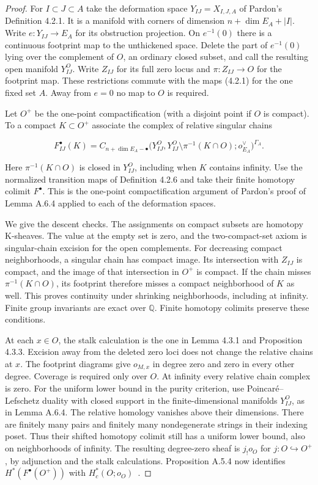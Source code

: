 \begin{proof}
For $I\subset J\subset A$ take the deformation
space $Y_{IJ}=X_{I,J,A}$ of Pardon's Definition 4.2.1. It is a
manifold with corners of dimension $n+\dim E_A+|I|$. Write
$e:Y_{IJ}\to E_A$ for its obstruction projection. On $e^{-1}(0)$
there is a continuous footprint map to the unthickened space.
Delete the part of $e^{-1}(0)$ lying over the complement of $O$,
an ordinary closed subset, and call the resulting open manifold
$Y^O_{IJ}$. Write $Z_{IJ}$ for its full zero locus and
$\pi:Z_{IJ}\to O$ for the footprint map. These restrictions commute
with the maps (4.2.1) for the one fixed set $A$. Away from $e=0$
no map to $O$ is required.

Let $O^+$ be the one-point compactification (with a disjoint point
if $O$ is compact). To a compact $K\subset O^+$ associate the
complex of relative singular chains

\[
 F_{IJ}^\bullet(K)=
 C_{n+\dim E_A-\bullet}
 \big(Y^O_{IJ},Y^O_{IJ}\setminus\pi^{-1}(K\cap O);
                     o_{E_A}^{\vee}\big)^{\Gamma_A}.
\]

Here $\pi^{-1}(K\cap O)$ is closed in $Y^O_{IJ}$, including when
$K$ contains infinity. Use the normalized transition maps of
Definition 4.2.6 and take their finite homotopy colimit $F^\bullet$.
This is the one-point compactification argument of Pardon's proof
of Lemma A.6.4 applied to each of the deformation spaces.

We give the descent checks. The assignments on compact subsets
are homotopy K-sheaves. The value at the empty set is zero, and the
two-compact-set axiom is singular-chain excision for the open
complements. For decreasing compact neighborhoods, a singular chain
has compact image. Its intersection with $Z_{IJ}$ is compact, and
the image of that intersection in $O^+$ is compact. If the chain
misses $\pi^{-1}(K\cap O)$, its footprint therefore misses a compact
neighborhood of $K$ as well. This proves continuity under shrinking
neighborhoods, including at infinity. Finite group invariants are
exact over $\mathbb Q$. Finite homotopy colimits preserve these
conditions.

At each $x\in O$, the stalk calculation is the one in Lemma 4.3.1
and Proposition 4.3.3. Excision away from the deleted zero loci
does not change the relative chains at $x$. The footprint diagrams
give $o_{M,x}$ in degree zero and zero in every other degree.
Coverage is required only over $O$. At infinity every relative
chain complex is zero. For the uniform lower bound in the purity
criterion, use Poincaré--Lefschetz duality with closed support in
the finite-dimensional manifolds $Y^O_{IJ}$, as in Lemma A.6.4.
The relative homology vanishes above their dimensions. There are
finitely many pairs and finitely many nondegenerate strings in
their indexing poset. Thus their shifted homotopy colimit still
has a uniform lower bound, also on neighborhoods of infinity.
The resulting degree-zero sheaf is $j_!o_O$ for $j:O\hookrightarrow
O^+$, by adjunction and the stalk calculations. Proposition A.5.4
now identifies $H^*(F^\bullet(O^+))$ with $H_c^*(O;o_O)$~\cite[\S\S4.2--4.3, Proposition A.5.4 and Lemma A.6.4]{Atlas}.


\end{proof}
